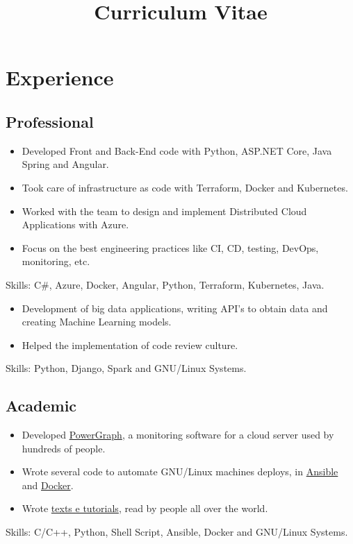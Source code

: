 \documentclass[10pt, a4paper, roman]{moderncv} %
\title{Curriculum Vitae}
\begin{document}
\makecvtitle %

\section{Experience}
\subsection{Professional}

{
}


{
    \begin{itemize}
        \item Developed Front and Back-End code with Python, ASP.NET Core, Java Spring and Angular.
	    \item Took care of infrastructure as code with Terraform, Docker and Kubernetes.
	    \item Worked with the team to design and implement Distributed Cloud Applications with Azure.
	    \item Focus on the best engineering practices like CI, CD, testing, DevOps, monitoring, etc.
    \end{itemize}
Skills: C\#, Azure, Docker, Angular, Python, Terraform, Kubernetes, Java.
}

{
    \begin{itemize}
        \item Development of big data applications, writing API's to obtain data and creating Machine Learning models. 
        \item Helped the implementation of code review culture.
    \end{itemize}
    Skills: Python, Django, Spark and GNU/Linux Systems.
}

\subsection{Academic}
{
    \begin{itemize}
        \item Developed \href{https://github.com/Guilhermeslucas/powergraph}{PowerGraph}, a monitoring software for a cloud server used by hundreds of people.
        \item Wrote several code to automate GNU/Linux machines deploys, in \href{https://github.com/Guilhermeslucas/Ansible-Code}{Ansible} and 
            \href{https://github.com/Guilhermeslucas/Dockerfiles}{Docker}.
        \item Wrote \href{http://openpower.ic.unicamp.br/blog/}{texts e tutorials}, read by people all over the world. 
    \end{itemize}
    Skills: C/C++, Python, Shell Script, Ansible, Docker and GNU/Linux Systems.
}
\end{document}
